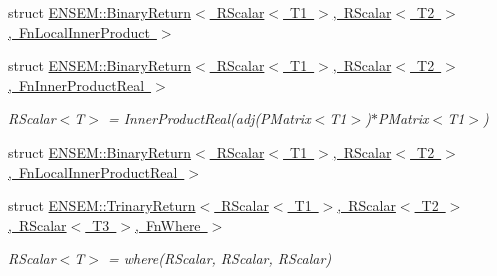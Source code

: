 \begin{DoxyCompactItemize}
struct \mbox{\hyperlink{structENSEM_1_1BinaryReturn_3_01RScalar_3_01T1_01_4_00_01RScalar_3_01T2_01_4_00_01FnLocalInnerProduct_01_4}{E\+N\+S\+E\+M\+::\+Binary\+Return$<$ R\+Scalar$<$ T1 $>$, R\+Scalar$<$ T2 $>$, Fn\+Local\+Inner\+Product $>$}}
\item 
struct \mbox{\hyperlink{structENSEM_1_1BinaryReturn_3_01RScalar_3_01T1_01_4_00_01RScalar_3_01T2_01_4_00_01FnInnerProductReal_01_4}{E\+N\+S\+E\+M\+::\+Binary\+Return$<$ R\+Scalar$<$ T1 $>$, R\+Scalar$<$ T2 $>$, Fn\+Inner\+Product\+Real $>$}}
\begin{DoxyCompactList}\small\item\em R\+Scalar$<$\+T$>$ = Inner\+Product\+Real(adj(\+P\+Matrix$<$\+T1$>$)$\ast$\+P\+Matrix$<$\+T1$>$) \end{DoxyCompactList}\item 
struct \mbox{\hyperlink{structENSEM_1_1BinaryReturn_3_01RScalar_3_01T1_01_4_00_01RScalar_3_01T2_01_4_00_01FnLocalInnerProductReal_01_4}{E\+N\+S\+E\+M\+::\+Binary\+Return$<$ R\+Scalar$<$ T1 $>$, R\+Scalar$<$ T2 $>$, Fn\+Local\+Inner\+Product\+Real $>$}}
\item 
struct \mbox{\hyperlink{structENSEM_1_1TrinaryReturn_3_01RScalar_3_01T1_01_4_00_01RScalar_3_01T2_01_4_00_01RScalar_3_01T3_01_4_00_01FnWhere_01_4}{E\+N\+S\+E\+M\+::\+Trinary\+Return$<$ R\+Scalar$<$ T1 $>$, R\+Scalar$<$ T2 $>$, R\+Scalar$<$ T3 $>$, Fn\+Where $>$}}
\begin{DoxyCompactList}\small\item\em R\+Scalar$<$\+T$>$ = where(\+R\+Scalar, R\+Scalar, R\+Scalar) \end{DoxyCompactList}\end{DoxyCompactItemize}
